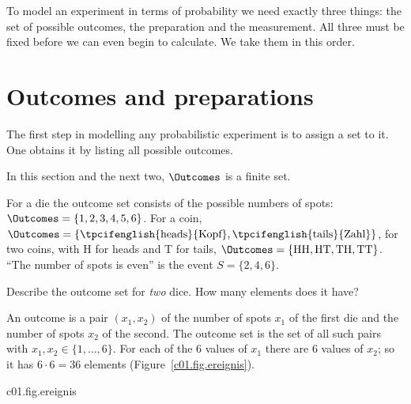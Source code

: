 To model an experiment in terms of probability we need exactly three things: the set of
possible outcomes, the preparation and the measurement. All three must be fixed before we
can even begin to calculate. We take them in this order.

\section{Outcomes and preparations}\label{c01.s1}

The first step in modelling any probabilistic experiment is to assign a set to it. One
obtains it by listing all possible outcomes.


In this section and the next two, $\Outcomes$ is a finite set.

\begin{example}\label{c01.ex.wuerfel}
  For a die the outcome set consists of the possible numbers of spots:
  $\Outcomes = \{1, 2, 3, 4, 5, 6\}$. For a coin,
  $\Outcomes = \{\text{\tpcifenglish{heads}{Kopf}}, \text{\tpcifenglish{tails}{Zahl}}\}$,
  for two coins, with H for heads and T for tails,
  $\Outcomes = \{\text{HH}, \text{HT}, \text{TH}, \text{TT}\}$. “The number of spots is
  even” is the event $S = \{2, 4, 6\}$.
\end{example}

\begin{exercise}\label{c01.exc.zwei-wuerfel}
  Describe the outcome set for \emph{two} dice. How many elements does it have?
\end{exercise}
\begin{solution}
  An outcome is a pair $(x_1, x_2)$ of the number of spots $x_1$ of the first die and the
  number of spots $x_2$ of the second. The outcome set is the set of all such pairs with
  $x_1, x_2 \in \{1, \dots, 6\}$. For each of the $6$ values of $x_1$ there are $6$ values
  of $x_2$; so it has $6 \cdot 6 = 36$ elements
  (Figure~\ref{c01.fig.ereignis}).
\end{solution}

\begin{tpcfigure}{c01.fig.ereignis}

  \caption{Outcome sets and events. (a) One die: six outcomes; the event “even number of
    spots” is the set of hatched cells. (b) Two dice: every point is a pair $(x_1, x_2)$,
    $36$ outcomes in all. The event “the sum of the spots is $7$” consists of the six
    pairs marked by squares.}
\end{tpcfigure}

